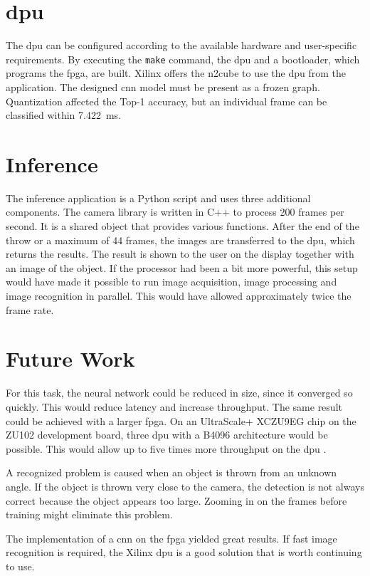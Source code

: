 \section{\Acrlong{dpu}}
\label{sec:conclusion:dpu}
The \acrshort{dpu} can be configured according to the available hardware and user-specific requirements.
By executing the \texttt{make} command, the \acrshort{dpu} and a bootloader, which programs the \acrshort{fpga}, are built.
Xilinx offers the \acrshort{n2cube}  to use the \acrshort{dpu} from the application.
The designed \acrshort{cnn} model must be present as a frozen graph.
Quantization affected the Top-1 accuracy, but an individual frame can be classified within \SI{7.422}{ms}.

\section{Inference}
\label{sec:conclusion:inference}
The inference application is a Python script and uses three additional components.
The camera library is written in C++ to process 200 frames per second.
It is a shared object that provides various functions.
After the end of the throw or a maximum of 44 frames, the images are transferred to the \acrshort{dpu}, which returns the results.
The result is shown to the user on the display together with an image of the object.
If the processor had been a bit more powerful, this setup would have made it possible to run image acquisition, image processing and image recognition in parallel.
This would have allowed approximately twice the frame rate.

\section{Future Work}
\label{sec:conclusion:future_work}
For this task, the neural network could be reduced in size, since it converged so quickly.
This would reduce latency and increase throughput.
The same result could be achieved with a larger \acrshort{fpga}.
On an UltraScale+ XCZU9EG chip on the ZU102 development board, three \acrshort{dpu}  with a B4096 architecture would be possible.
This would allow up to five times more throughput on the \acrshort{dpu} \cite{dpu_product_guide}.

A recognized problem is caused when an object is thrown from an unknown angle.
If the object is thrown very close to the camera, the detection is not always correct because the object appears too large.
Zooming in on the frames before training might eliminate this problem.

The implementation of a \acrlong{cnn} on the \acrshort{fpga} yielded great results.
If fast image recognition is required, the Xilinx \acrshort{dpu} is a good solution that is worth continuing to use.
